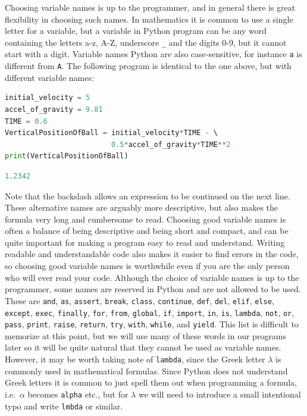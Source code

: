 \documentclass[graybox,envcountchap,sectrefs,final]{svmonodo}
\begin{document}
Choosing variable names is up to the programmer, and in general there is great flexibility in choosing such names.
In mathematics it is common to use a single letter for a variable, but a variable in Python program can be any
word containing the letters a-z, A-Z, underscore \Verb!_! and the digits 0-9, but it cannot start with a digit. Variable names
Python are also case-sensitive, for instance \texttt{a} is different from \texttt{A}. The following program is identical to the
one above, but with different variable names:
\begin{lstlisting}[language=Python,style=blue1bar]
initial_velocity = 5
accel_of_gravity = 9.81
TIME = 0.6
VerticalPositionOfBall = initial_velocity*TIME - \ 
                         0.5*accel_of_gravity*TIME**2
print(VerticalPositionOfBall)
\end{lstlisting}
\begin{lstlisting}[language=Python,style=gray]
1.2342
\end{lstlisting}
Note that the backslash allows an expression to be continued on the next line. These alternative names are arguably
more descriptive, but also makes the formula very long and cumbersome to read. Choosing good variable names is often a
balance of being descriptive and being short and compact, and can be quite important for making a program easy to
read and understand. Writing readable and understandable code also makes it easier to find errors in the code, so
choosing good variable names is worthwhile even if you are the only person who will ever read your code. Although the
choice of variable names is up to the programmer, some names are reserved in Python and are not allowed to be used. These are \texttt{and},
\texttt{as},
\texttt{assert},
\texttt{break},
\texttt{class},
\texttt{continue},
\texttt{def},
\texttt{del},
\texttt{elif},
\texttt{else},
\texttt{except},
\texttt{exec},
\texttt{finally},
\texttt{for},
\texttt{from},
\texttt{global},
\texttt{if},
\texttt{import},
\texttt{in},
\texttt{is},
\texttt{lambda},
\texttt{not},
\texttt{or},
\texttt{pass},
\texttt{print},
\texttt{raise},
\texttt{return},
\texttt{try},
\texttt{with},
\texttt{while}, and
\texttt{yield}.
This list is difficult to memorize at this point, but we will use many of these words in our programs later so it will be
quite natural that they cannot be used as variable names. However, it may be worth taking note of \texttt{lambda}, since the Greek
letter $\lambda$ is commonly used in mathematical formulas. Since
Python does not understand Greek letters it is common to just spell them out when programming a formula, i.e.~$\alpha$ becomes \texttt{alpha} etc.,
but for $\lambda$ we will need to introduce a small intentional typo and write \texttt{lmbda} or similar.
\end{document}
